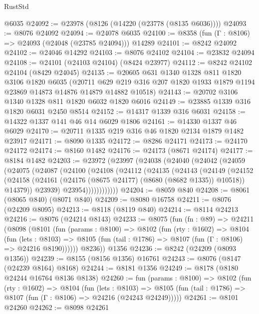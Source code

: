\begin{lexlean}{RustStd}
\begin{coremodule}
    @6035
@24092 := @23978 (@8126 (@14220 (@23778 (@8135 @6036))))
@24093 := @8076 @24092
@24094 := @24078 @6035
@24100 := @8358 (fun (Γ : @8106) => @24093 (@24048 (@23785 @24094))) @14289
@24101 := @8242 @24092
@24102 := @24046 @14292
@24103 := @8076 @24102
@24104 := @23832 @24094
@24108 := @24101 (@24103 @24104) (@8424 @23977)
@24112 := @8242 @24102 @24104 (@8429 @24045)
@24135 := @20605
    @631
    @1340
    @1328
    @811
    @1820
    @3106
    @1820
    @6035
    (@20711 @629 @219 @316 @207 @1820 @1933 @1879 @1194 @23869 @14873 @14876 @14879 @14882 @10518)
@24143 := @20702 @3106 @1340 @1328 @811 @1820 @6032 @1820 @6016
@24149 := @23885 @1339 @316 @1820 @6031 @2450 @8514
@24152 := @14317 @1339 @316 @6031
@24158 := @14322 @1337 @141 @46 @14 @6029 @1806
@24161 := @14330 @1337 @46 @6029
@24170 := @20711 @1335 @219 @316 @46 @1820 @2134 @1879 @1482 @23917
@24171 := @8090 @1335
@24172 := @8286 @24171
@24173 := @24170 @24172
@24174 := @8160 @1482
@24176 := @24173 (@8671 @24174)
@24177 := @8184 @1482
@24203 := @23972
    (@23997
      (@24038
        (@24040
          (@24042
            (@24059
              (@24075
                (@24087
                  (@24100
                    (@24108
                      (@24112
                        (@24135
                          (@24143
                            (@24149
                              (@24152
                                (@24158
                                  (@24161 (@24176 (@8675 @24177) (@8680 (@8682 @1335)) @10518))
                                  @14379))
                              @23939)
                            @23954))))))))))))
@24204 := @8059 @840
@24208 := @8061 (@8065 @840) (@8071 @840)
@24209 := @8080 @16758
@24211 := @8076 (@24209 @8095)
@24213 := @8118 (@8119 @840)
@24214 := @8114 @24213
@24216 := @8076 (@24214 @8143)
@24233 := @8075
    (fun (fn : @89) =>
    @24211
      (@8098
        (@8101
          (fun (params : @8100) =>
          @8102
            (fun (rty : @1602) =>
            @8104
              (fun (lets : @8103) =>
              @8105 (fun (tail : @1786) => @8107 (fun (Γ : @8106) => @24216 @8190))))))
        @8236))
    @1356
@24236 := @8242 (@24209 (@8093 @1356))
@24239 := @8155 (@8156 @1356) @16761
@24243 := @8076 (@8147 (@24239 @8164) @8168)
@24244 := @8181 @1356
@24249 := @8178 (@8180 @24244 @16764 @8136 @8138)
@24260 := fun (params : @8100) =>
  @8102
    (fun (rty : @1602) =>
    @8104
      (fun (lets : @8103) =>
      @8105 (fun (tail : @1786) => @8107 (fun (Γ : @8106) => @24216 (@24243 @24249)))))
@24261 := @8101 @24260
@24262 := @8098 @24261

\end{coremodule}
\end{lexlean}
